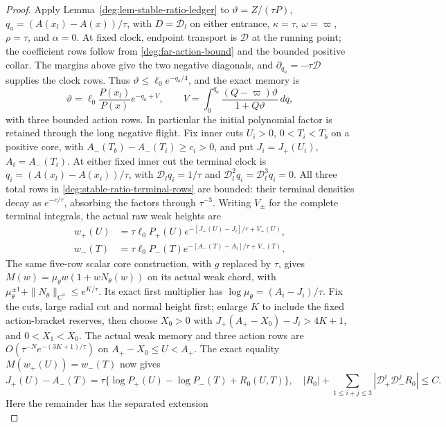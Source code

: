 \begin{proof}
Apply Lemma~\ref{deg:lem-stable-ratio-ledger} to
\(\vartheta=Z/(\tau P)\), \(q_a=(A(x_l)-A(x))/\tau\), with
\(D=\mathcal D_l\) on either entrance, \(\kappa=\tau\), \(\omega=\varpi\),
\(\rho=\tau\), and \(\alpha=0\). At fixed clock, endpoint
transport is \(\mathcal D\) at the running point; the coefficient
rows follow from \eqref{deg:far-action-bound} and the bounded positive
collar. The margins above give the two negative diagonals, and
\(\partial_{q_a}=-\tau\mathcal D\) supplies the clock rows.
Thus \(\vartheta\le\ell_0e^{-q_a/4}\), and the exact memory is
\[
 \vartheta=\ell_0\frac{P(x_l)}{P(x)}e^{-q_a+V},\qquad
 V=\int_0^{q_a}\frac{(Q-\varpi)\vartheta}{1+Q\vartheta}\,dq,
\]
with three bounded action rows. In particular the initial polynomial
factor is retained through the long negative flight.
Fix inner cuts \(U_i>0\), \(0<T_i<T_b\) on a positive core,
with \(A_-(T_b)-A_-(T_i)\ge c_i>0\), and put
\(J_i=J_+(U_i)\), \(A_i=A_-(T_i)\).
At either fixed inner cut the terminal clock is
\(q_i=(A(x_l)-A(x_i))/\tau\), with
\(\mathcal D_lq_i=1/\tau\) and
\(\mathcal D_l^2q_i=\mathcal D_l^3q_i=0\).
All three total rows in \eqref{deg:stable-ratio-terminal-rows}
are bounded: their terminal densities decay as \(e^{-c/\tau}\),
absorbing the factors through \(\tau^{-3}\).
Writing \(V_\pm\) for the complete terminal integrals, the actual
raw weak heights are
\[
 \begin{aligned}
 w_+(U)&=\tau\ell_0P_+(U)e^{-[J_+(U)-J_i]/\tau+V_+(U)},\\
 w_-(T)&=\tau\ell_0P_-(T)e^{-[A_-(T)-A_i]/\tau+V_-(T)}.
 \end{aligned}
\]
The same five-row scalar core construction, with \(g\) replaced by
\(\tau\), gives
\(M(w)=\mu_\theta w(1+wN_\theta(w))\) on its actual weak chord,
with \(\mu_\theta^{\pm1}+\|N_\theta\|_{C^3}\le e^{K/\tau}\).
Its exact first multiplier has
\(\log\mu_\theta=(A_i-J_i)/\tau\).
Fix the cuts, large radial cut and normal height first; enlarge \(K\)
to include the fixed action-bracket reserves, then choose
\(X_0>0\) with \(J_+(A_+-X_0)-J_i>4K+1\), and
\(0<X_1<X_0\). The actual weak memory and three action rows are
\(O(\tau^{-N}e^{-(3K+1)/\tau})\) on \(A_+-X_0\le U<A_+\).
The exact equality \(M(w_+(U))=w_-(T)\) now gives
\begin{equation}\label{deg:far-action}
 J_+(U)-A_-(T)=\tau\{\log P_+(U)-\log P_-(T)+R_0(U,T)\},
 \quad |R_0|+\sum_{1\le i+j\le3}|\mathcal D_+^i\mathcal D_-^jR_0|\le C.
\end{equation}
Here the remainder has the separated extension
\begin{equation}\label{deg:far-separated-remainder}

\end{equation}
\end{proof}
